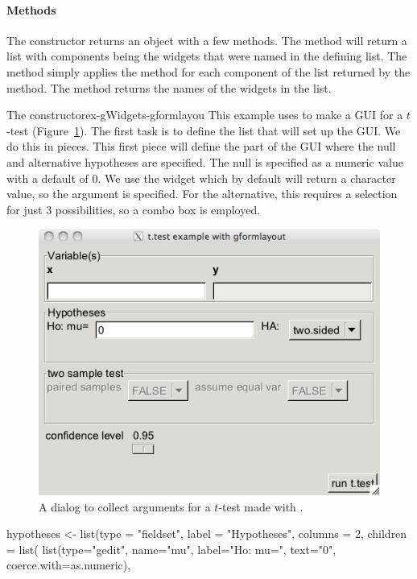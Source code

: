\paragraph{Methods}
The constructor returns an object with a few methods. The
\method{[}{gformlayout} method will return a list with
components being the widgets that were named in the defining list. The
 method simply applies the 
method for each component of the list returned by the \code{[}
method. The  method returns the names of the widgets in the list.


\begin{example}{The  constructor}{ex-gWidgets-gformlayou}
This example uses  to make a GUI for a $t$-test (Figure~\ref{fig:ex-gWidgets-formlayout}). The
first task is to define the list that will set up the GUI. We do this
in pieces. This first piece will define the part of the GUI where the
null and alternative hypotheses are specified. The null is specified
as a numeric value with a default of 0. We use the  widget
which by default will return a character value, so the
 argument is specified. For the alternative, this
requires a selection for just 3 possibilities, so a combo box is
employed.
\begin{figure}
  \centering
  \includegraphics[width=.65\textwidth]{ex-gWidgets-formlayout}
  \caption{A dialog to collect arguments for a $t$-test made with .}
  \label{fig:ex-gWidgets-formlayout}
\end{figure}


\begin{Schunk}
\begin{Sinput}
 hypotheses <- 
   list(type = "fieldset",
        label = "Hypotheses",
        columns = 2, 
        children = list(
          list(type="gedit",                            
               name="mu", label="Ho: mu=",
               text="0", coerce.with=as.numeric),
          

\end{Sinput}
\end{Schunk}
\end{example}
